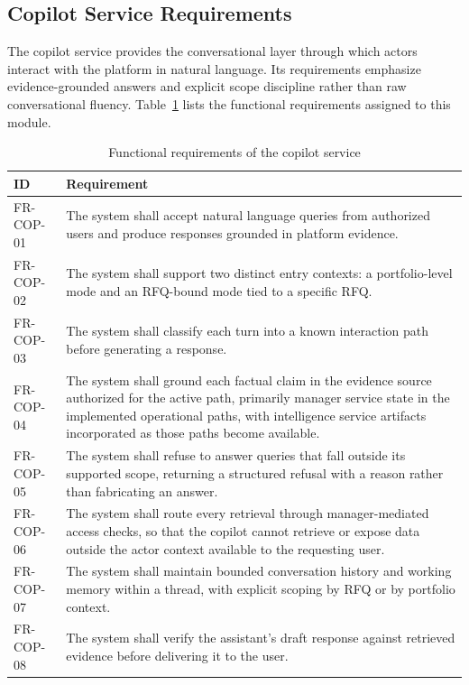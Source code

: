 \subsection*{Copilot Service Requirements}
The copilot service provides the conversational layer through which actors interact with the platform in natural language. Its requirements emphasize evidence-grounded answers and explicit scope discipline rather than raw conversational fluency. Table~\ref{tab:fr_copilot} lists the functional requirements assigned to this module.

\begin{table}[H]
\centering
\renewcommand{\arraystretch}{1.3}
\begin{tabular}{|p{1.8cm}|p{12cm}|}
\hline
\rowcolor{lightgray}
\textbf{ID} & \textbf{Requirement} \\ \hline
FR-COP-01 & The system shall accept natural language queries from authorized users and produce responses grounded in platform evidence. \\ \hline
FR-COP-02 & The system shall support two distinct entry contexts: a portfolio-level mode and an RFQ-bound mode tied to a specific RFQ. \\ \hline
FR-COP-03 & The system shall classify each turn into a known interaction path before generating a response. \\ \hline
FR-COP-04 & The system shall ground each factual claim in the evidence source authorized for the active path, primarily manager service state in the implemented operational paths, with intelligence service artifacts incorporated as those paths become available. \\ \hline
FR-COP-05 & The system shall refuse to answer queries that fall outside its supported scope, returning a structured refusal with a reason rather than fabricating an answer. \\ \hline
FR-COP-06 & The system shall route every retrieval through manager-mediated access checks, so that the copilot cannot retrieve or expose data outside the actor context available to the requesting user. \\ \hline
FR-COP-07 & The system shall maintain bounded conversation history and working memory within a thread, with explicit scoping by RFQ or by portfolio context. \\ \hline
FR-COP-08 & The system shall verify the assistant's draft response against retrieved evidence before delivering it to the user. \\ \hline
\end{tabular}
\caption{Functional requirements of the copilot service}
\label{tab:fr_copilot}
\end{table}

